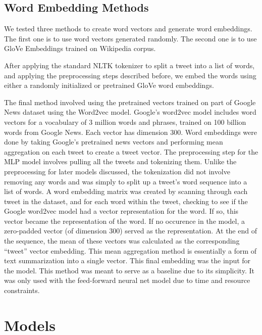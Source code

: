 \documentclass[11pt,a4paper]{article}
\begin{document}
	\subsection{Word Embedding Methods}
	We tested three methods to create word vectors and generate word embeddings. The first one is to use word vectors generated randomly. The second one is to use GloVe Embeddings trained on Wikipedia corpus. 
	\par
	After applying the standard NLTK tokenizer to split a tweet into a list of words, and applying the preprocessing steps described before, we embed the words using either a randomly initialized or pretrained GloVe word embeddings.
	\par
	The final method involved using the pretrained vectors trained on part of Google News dataset using the Word2vec model. Google’s word2vec model includes word vectors for a vocabulary of 3 million words and phrases, trained on 100 billion words from Google News. Each vector has dimension 300. Word embeddings were done by taking Google’s pretrained news vectors and performing mean aggregation on each tweet to create a tweet vector. The preprocessing step for the MLP model involves pulling all the tweets and tokenizing them. Unlike the preprocessing for later models discussed, the tokenization did not involve removing any words and was simply to split up a tweet’s word sequence into a list of words. A word embedding matrix was created by scanning through each tweet in the dataset, and for each word within the tweet, checking to see if the Google word2vec model had a vector representation for the word. If so, this vector became the representation of the word. If no occurence in the model, a zero-padded vector (of dimension 300) served as the representation. At the end of the sequence, the mean of these vectors was calculated as the corresponding “tweet” vector embedding. This mean aggregation method is essentially a form of text summarization into a single vector. This final embedding was the input for the model. This method was meant to serve as a baseline due to its simplicity. It was only used with the feed-forward neural net model due to time and resource constraints.
	
	\section{Models}
	
\end{document}

